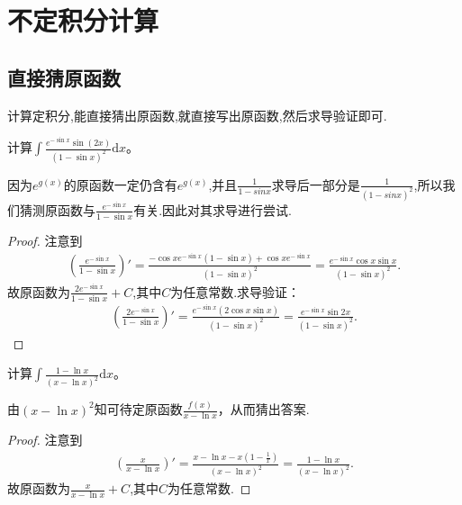 \documentclass[../../main.tex]{subfiles}%
\begin{document}
\section{不定积分计算}

\subsection{直接猜原函数}

计算定积分,能直接猜出原函数,就直接写出原函数,然后求导验证即可.

\vspace{0.5cm}

\begin{example}
计算\(\int \frac{e^{-\sin x}\sin(2x)}{(1 - \sin x)^2}\mathrm{d}x\)。
\end{example}
\begin{note}
因为$e^{g(x)}$的原函数一定仍含有$e^{g(x)}$,并且$\frac{1}{1-sinx}$求导后一部分是$\frac{1}{(1-sinx)^2}$,所以我们猜测原函数与$\frac{e^{-\sin x}}{1-\sin x}$有关.因此对其求导进行尝试.
\end{note}
\begin{proof}

注意到
\begin{align*}
\left(\frac{e^{-\sin x}}{1 - \sin x}\right)' = \frac{-\cos x e^{-\sin x}(1 - \sin x)+\cos x e^{-\sin x}}{(1 - \sin x)^2}
=\frac{e^{-\sin x}\cos x\sin x}{(1 - \sin x)^2}.
\end{align*}
故原函数为\(\frac{2e^{-\sin x}}{1 - \sin x}+C\),其中$C$为任意常数.求导验证：
\begin{align*}
\left(\frac{2e^{-\sin x}}{1 - \sin x}\right)'=\frac{e^{-\sin x}(2\cos x\sin x)}{(1 - \sin x)^2}=\frac{e^{-\sin x}\sin 2x}{(1 - \sin x)^2}.
\end{align*} 

\end{proof}

\begin{example}
计算\(\int \frac{1 - \ln x}{(x - \ln x)^2}\mathrm{d}x\)。
\end{example}
\begin{note}
由\((x - \ln x)^2\)知可待定原函数\(\frac{f(x)}{x - \ln x}\)，从而猜出答案.
\end{note}
\begin{proof}

注意到
\begin{align*}
\left( \frac{x}{x-\ln x} \right) \prime =\frac{x-\ln x-x\left( 1-\frac{1}{x} \right)}{\left( x-\ln x \right) ^2}=\frac{1-\ln x}{\left( x-\ln x \right) ^2}.
\end{align*}
故原函数为$\frac{x}{x-\ln x}+C$,其中$C$为任意常数.

\end{proof}
\end{document}
